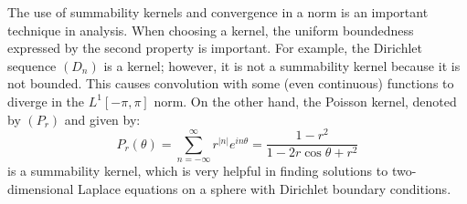 \documentclass[letterpaper,12pt,fleqn,reqno]{amsart}
\theoremstyle{plain}
\renewcommand{\o}{\theta}
\newcommand{\Lop}{L^1[-\pi,\pi]}
\newcommand{\abs}[1]{\left|#1\right|}
\begin{document}
The use of summability kernels and convergence in a norm is an important
technique in analysis. When choosing a kernel, the uniform boundedness
expressed by the second property is important. For example, the Dirichlet
sequence $(D_n)$ is a kernel; however, it is not a summability kernel because
it is not bounded. This causes convolution with some (even continuous) functions
to diverge in the $\Lop$ norm. On the other hand, the Poisson kernel, denoted
by $(P_r)$ and given by:
\[P_r(\o)=\sum_{n=-\infty}^{\infty}r^{\abs{n}}e^{in\o}=
\frac{1-r^2}{1-2r\cos\o+r^2}\]
is a summability kernel, which is very helpful in finding solutions to
two-dimensional Laplace equations on a sphere with Dirichlet boundary
conditions.

\nocite{*}


\end{document}
